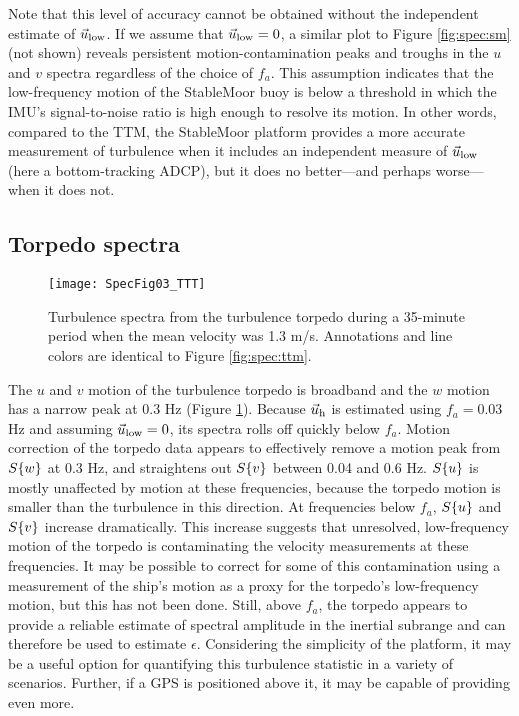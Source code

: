 Note that this level of accuracy cannot be obtained without the independent estimate of $\vec{u}_\mathrm{low}$. If we assume that $\vec{u}_\mathrm{low}=0$, a similar plot to Figure \ref{fig:spec:sm} (not shown) reveals persistent motion-contamination peaks and troughs in the $u$ and $v$ spectra regardless of the choice of $f_a$. This assumption indicates that the low-frequency motion of the StableMoor buoy is below a threshold in which the IMU's signal-to-noise ratio is high enough to resolve its motion. In other words, compared to the TTM, the StableMoor platform provides a more accurate measurement of turbulence when it includes an independent measure of $\vec{u}_\mathrm{low}$ (here a bottom-tracking ADCP), but it does no better---and perhaps worse---when it does not.
%
%


\subsection{Torpedo spectra}

\begin{figure}[t]
  \centering
  \texttt{[image: SpecFig03\_TTT]}
  \caption{Turbulence spectra from the turbulence torpedo during a 35-minute period when the mean velocity was 1.3 m/s. Annotations and line colors are identical to Figure \ref{fig:spec:ttm}.}
  \label{fig:spec:torpedo}
\end{figure}

The $u$ and $v$ motion of the turbulence torpedo is broadband and the $w$ motion has a narrow peak at 0.3 Hz (Figure \ref{fig:spec:torpedo}). Because $\vec{u}_\mathrm{h}$ is estimated using $f_a = 0.03$ Hz and assuming $\vec{u}_\mathrm{low}=0$, its spectra rolls off quickly below $f_a$.  Motion correction of the torpedo data appears to effectively remove a motion peak from $S\{w\}$ at 0.3 Hz, and straightens out $S\{v\}$ between 0.04 and 0.6 Hz. $S\{u\}$ is mostly unaffected by motion at these frequencies, because the torpedo motion is smaller than the turbulence in this direction. At frequencies below $f_a$, $S\{u\}$ and $S\{v\}$ increase dramatically. This increase suggests that unresolved, low-frequency motion of the torpedo is contaminating the velocity measurements at these frequencies. It may be possible to correct for some of this contamination using a measurement of the ship's motion as a proxy for the torpedo's low-frequency motion, but this has not been done. Still, above $f_a$, the torpedo appears to provide a reliable estimate of spectral amplitude in the inertial subrange and can therefore be used to estimate $\epsilon$. Considering the simplicity of the platform, it may be a useful option for quantifying this turbulence statistic in a variety of scenarios. Further, if a GPS is positioned above it, it may be capable of providing even more.


